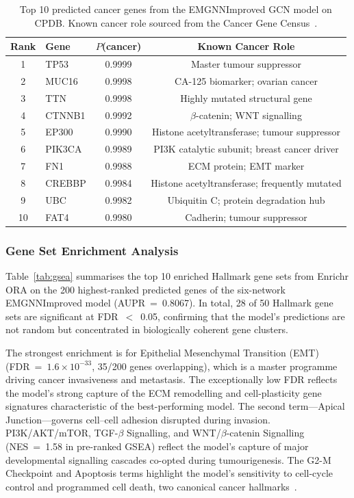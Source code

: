 \begin{table}[ht]
  \centering
  \caption{Top 10 predicted cancer genes from the EMGNNImproved GCN model on CPDB.
           Known cancer role sourced from the Cancer Gene Census~\cite{cgc2022}.}
  \label{tab:topgenes}
  \small
  \begin{tabular}{clcc}
    \toprule
    \textbf{Rank} & \textbf{Gene} & \textbf{$P$(cancer)} & \textbf{Known Cancer Role} \\
    \midrule
     1 & TP53   & 0.9999 & Master tumour suppressor \\
     2 & MUC16  & 0.9998 & CA-125 biomarker; ovarian cancer \\
     3 & TTN    & 0.9998 & Highly mutated structural gene \\
     4 & CTNNB1 & 0.9992 & $\beta$-catenin; WNT signalling \\
     5 & EP300  & 0.9990 & Histone acetyltransferase; tumour suppressor \\
     6 & PIK3CA & 0.9989 & PI3K catalytic subunit; breast cancer driver \\
     7 & FN1    & 0.9988 & ECM protein; EMT marker \\
     8 & CREBBP & 0.9984 & Histone acetyltransferase; frequently mutated \\
     9 & UBC    & 0.9982 & Ubiquitin C; protein degradation hub \\
    10 & FAT4   & 0.9980 & Cadherin; tumour suppressor \\
    \bottomrule
  \end{tabular}
\end{table}

\subsubsection{Gene Set Enrichment Analysis}

Table~\ref{tab:gsea} summarises the top 10 enriched Hallmark gene sets from Enrichr ORA
on the 200 highest-ranked predicted genes of the six-network EMGNNImproved model
(AUPR~=~0.8067). In total, 28 of 50 Hallmark gene sets are significant at
FDR~$<$~0.05, confirming that the model's predictions are not random but concentrated
in biologically coherent gene clusters.

The strongest enrichment is for Epithelial Mesenchymal Transition (EMT)
(FDR~=~$1.6\times10^{-33}$, 35/200 genes overlapping), which is a master programme
driving cancer invasiveness and metastasis. The exceptionally low FDR reflects the model's
strong capture of the ECM remodelling and cell-plasticity gene signatures characteristic
of the best-performing model. The second term---Apical Junction---governs cell--cell
adhesion disrupted during invasion. PI3K/AKT/mTOR, TGF-$\beta$ Signalling, and
WNT/$\beta$-catenin Signalling (NES~=~1.58 in pre-ranked GSEA) reflect the model's
capture of major developmental signalling cascades co-opted during tumourigenesis.
The G2-M Checkpoint and Apoptosis terms highlight the model's sensitivity to cell-cycle
control and programmed cell death, two canonical cancer hallmarks~\cite{hallmarks2011}.

